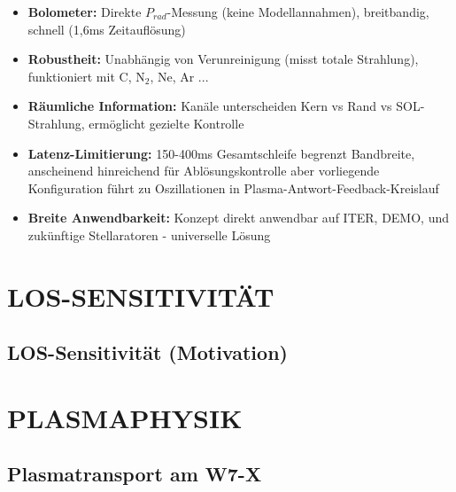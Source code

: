 \documentclass[11pt,a4paper]{article}
\begin{document}
\begin{itemize}
\item \textbf{Bolometer:} Direkte $P_{rad}$-Messung (keine Modellannahmen), breitbandig, schnell (1,6ms Zeitauflösung)
\item \textbf{Robustheit:} Unabhängig von Verunreinigung (misst totale Strahlung), funktioniert mit C, N$_2$, Ne, Ar ...
\item \textbf{Räumliche Information:} Kanäle unterscheiden Kern vs Rand vs SOL-Strahlung, ermöglicht gezielte Kontrolle
\item \textbf{Latenz-Limitierung:} 150-400ms Gesamtschleife begrenzt Bandbreite, anscheinend hinreichend für Ablösungskontrolle aber vorliegende Konfiguration führt zu Oszillationen in Plasma-Antwort-Feedback-Kreislauf
\item \textbf{Breite Anwendbarkeit:} Konzept direkt anwendbar auf ITER, DEMO, und zukünftige Stellaratoren - universelle Lösung
\end{itemize}

\section{LOS-SENSITIVITÄT}

\subsection{LOS-Sensitivität (Motivation)}

\begin{itemize}
\end{itemize}

\section{PLASMAPHYSIK}

\subsection{Plasmatransport am W7-X}
\end{document}
